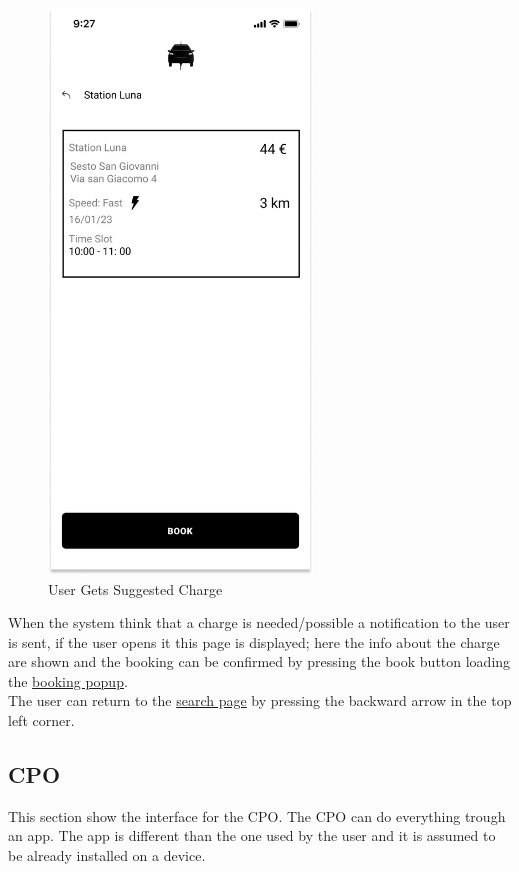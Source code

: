 \begin{figure}[H]
    \centering
    \includegraphics[keepaspectratio, height=15cm]{Mockup/UserAppInterface/Suggested Charge.png}
    \caption{User Gets Suggested Charge}
    \label{fig:Suggested}
\end{figure}
When the system think that a charge is needed/possible a notification to the user is sent, if the user opens it this page is displayed; here the info about the charge are shown and the booking can be confirmed by pressing the book button loading the \hyperref[pop:Booking]{booking popup}.\\
The user can return to the \hyperref[fig:Search]{search page} by pressing the backward arrow in the top left corner.
\subsection{CPO}
This section show the interface for the \ac{CPO}. The \ac{CPO} can do everything trough an app. The app is different than the one used by the user and it is assumed to be already installed on a device.
